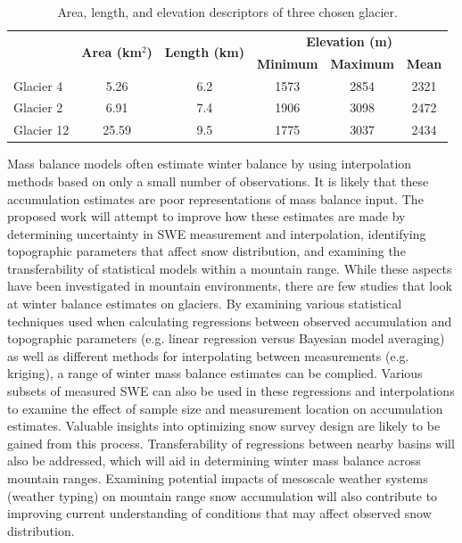 \documentclass{sfuthesis}
\begin{document}
\begin{table}[b]
\centering
\caption{Area, length, and elevation descriptors of three chosen glacier.}
\label{tab:glacierstats}
\begin{tabular}{|l|c|c|ccc|}
\hline
\multicolumn{1}{|c|}{} & \multirow{2}{*}{\textbf{Area (km$^2$)}} & \multirow{2}{*}{\textbf{Length (km)}} & \multicolumn{3}{c|}{\textbf{Elevation (m)}}         \\
\multicolumn{1}{|c|}{} &                                         &                                       & \textbf{Minimum} & \textbf{Maximum} & \textbf{Mean} \\ \hline
Glacier 4              & 5.26                                    & 6.2                                   & 1573             & 2854             & 2321          \\
Glacier 2              & 6.91                                    & 7.4                                   & 1906             & 3098             & 2472          \\
Glacier 12             & 25.59                                   & 9.5                                   & 1775             & 3037             & 2434          \\ \hline
\end{tabular}
\end{table} 

Mass balance models often estimate winter balance by using interpolation methods based on only a small number of observations. It is likely that these accumulation estimates are poor representations of mass balance input. The proposed work will attempt to improve how these estimates are made by determining uncertainty in SWE measurement and interpolation, identifying topographic parameters that affect snow distribution, and examining the transferability of statistical models within a mountain range. While these aspects have been investigated in mountain environments, there are few studies that look at winter balance estimates on glaciers. By examining various statistical techniques used when calculating regressions between observed accumulation and topographic parameters (e.g. linear regression versus Bayesian model averaging) as well as different methods for interpolating between measurements (e.g. kriging), a range of winter mass balance estimates can be complied. Various subsets of measured SWE can also be used in these regressions and interpolations to examine the effect of sample size and measurement location on accumulation estimates. Valuable insights into optimizing snow survey design are likely to be gained from this process. Transferability of regressions between nearby basins will also be addressed, which will aid in determining winter mass balance across mountain ranges. Examining potential impacts of mesoscale weather systems (weather typing) on mountain range snow accumulation will also contribute to improving current understanding of conditions that may affect observed snow distribution. 
\end{document}
